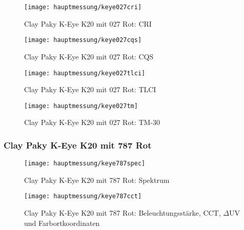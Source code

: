 \documentclass[pagesize,paper=A4,fontsize=12pt,utf8,numbers=noenddot,bibliography=totoc,listof=totoc,DIV=11,BCOR=1mm]{scrreprt}
\begin{document}
\begin{figure}[htp]     %
\centering
\texttt{[image: hauptmessung/keye027cri]} 
\caption {Clay Paky K-Eye K20 mit 027 Rot: CRI} 
\end{figure}

\begin{figure}[htp]     %
\centering
\texttt{[image: hauptmessung/keye027cqs]} 
\caption {Clay Paky K-Eye K20 mit 027 Rot: CQS} 
\end{figure}

\begin{figure}[htp]     %
\centering
\texttt{[image: hauptmessung/keye027tlci]} 
\caption {Clay Paky K-Eye K20 mit 027 Rot: TLCI} 
\end{figure}

\begin{figure}[htp]     %
\centering
\texttt{[image: hauptmessung/keye027tm]} 
\caption {Clay Paky K-Eye K20 mit 027 Rot: TM-30} 
\end{figure}

\subsubsection{Clay Paky K-Eye K20 mit 787 Rot}

\begin{figure}[htp]     %
\centering
\texttt{[image: hauptmessung/keye787spec]} 
\caption {Clay Paky K-Eye K20 mit 787 Rot: Spektrum} 
\end{figure}

\begin{figure}[htp]     %
\centering
\texttt{[image: hauptmessung/keye787cct]} 
\caption {Clay Paky K-Eye K20 mit 787 Rot: Beleuchtungsstärke, CCT, $\Delta$UV und Farbortkoordinaten} 
\end{figure}
\end{document}
